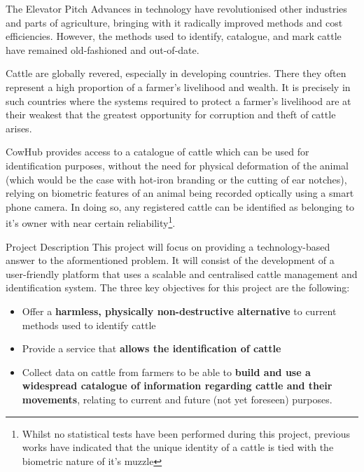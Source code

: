 

\begin{subsection}{The Elevator Pitch}
  Advances in technology have revolutionised other industries and parts of agriculture, bringing with it radically improved methods and cost efficiencies. However, the methods used to identify, catalogue, and mark cattle have remained old-fashioned and out-of-date.

  Cattle are globally revered, especially in developing countries. There they often represent a high proportion of a farmer's livelihood and wealth. It is precisely in such countries where the systems required to protect a farmer's livelihood are at their weakest that the greatest opportunity for corruption and theft of cattle arises.

  CowHub provides access to a catalogue of cattle which can be used for identification purposes, without the need for physical deformation of the animal (which would be the case with hot-iron branding or the cutting of ear notches), relying on biometric features of an animal being recorded optically using a smart phone camera. In doing so, any registered cattle can be identified as belonging to it's owner with near certain reliability\footnote{Whilst no statistical tests have been performed during this project, previous works have indicated that the unique identity of a cattle is tied with the biometric nature of it's muzzle}.
\end{subsection}


\begin{subsection}{Project Description}
  This project will focus on providing a technology-based answer to the aformentioned problem. It will consist of the development of a user-friendly platform that uses a scalable and centralised cattle management and identification system. The three key objectives for this project are the following:

  \begin{itemize}
  	\item Offer a \textbf{harmless, physically non-destructive alternative} to current methods used to identify cattle
  	\item Provide a service that \textbf{allows the identification of cattle}
  	\item Collect data on cattle from farmers to be able to \textbf{build and use a widespread catalogue of information regarding cattle and their movements}, relating to current and future (not yet foreseen) purposes.
  \end{itemize}

\end{subsection}

